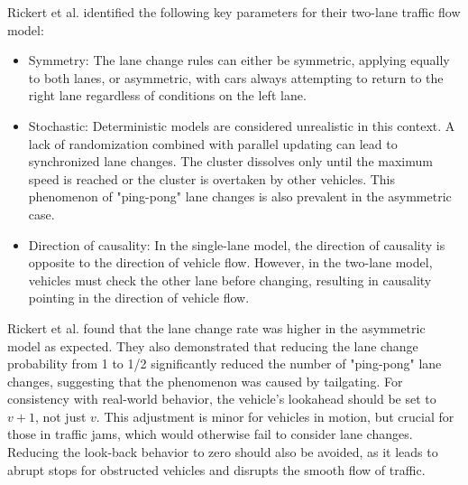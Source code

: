 Rickert et al. identified the following key parameters for their two-lane traffic flow model:
\begin{itemize}
\item Symmetry: The lane change rules can either be symmetric, applying equally to both lanes, or asymmetric, with cars always attempting to return to the right lane regardless of conditions on the left lane.
\item Stochastic: Deterministic models are considered unrealistic in this context. A lack of randomization combined with parallel updating can lead to synchronized lane changes. The cluster dissolves only until the maximum speed is reached or the cluster is overtaken by other vehicles. This phenomenon of "ping-pong" lane changes is also prevalent in the asymmetric case. 
\item Direction of causality: In the single-lane model, the direction of causality is opposite to the direction of vehicle flow. However, in the two-lane model, vehicles must check the other lane before changing, resulting in causality pointing in the direction of vehicle flow. 
\end{itemize}

Rickert et al. found that the lane change rate was higher in the asymmetric model as expected. They also demonstrated that reducing the lane change probability from 1 to 1/2 significantly reduced the number of "ping-pong" lane changes, suggesting that the phenomenon was caused by tailgating.
For consistency with real-world behavior, the vehicle's lookahead should be set to $v+1$, not just $v$. This adjustment is minor for vehicles in motion, but crucial for those in traffic jams, which would otherwise fail to consider lane changes. Reducing the look-back behavior to zero should also be avoided, as it leads to abrupt stops for obstructed vehicles and disrupts the smooth flow of traffic.

